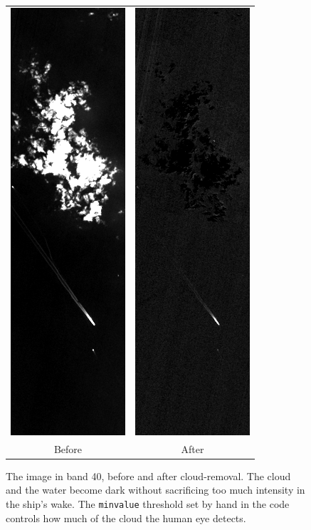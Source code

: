 \documentclass[12pt]{article}
\begin{document}
\begin{figure}[!b]
\begin{center}
\begin{tabular}{c c}
\includegraphics[width=0.28\linewidth]{cloud_removal_before.png} &
\includegraphics[width=0.28\linewidth]{cloud_removal_after.png} \\
Before & After
\end{tabular}
\end{center}
\caption{The image in band 40, before and after cloud-removal.  The
  cloud and the water become dark without sacrificing too much
  intensity in the ship's wake.  The {\tt minvalue} threshold set by
  hand in the code controls how much of the cloud the human eye
  detects.  \label{cloud_removal}}
\end{figure}
\end{document}
